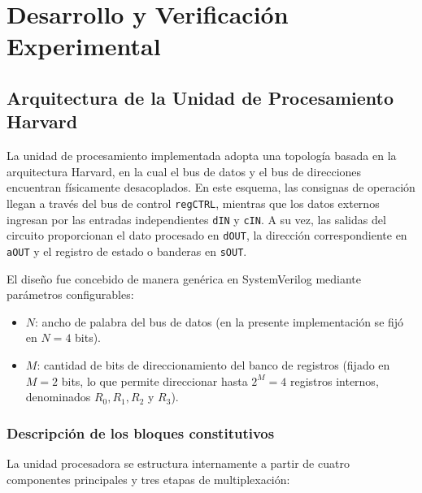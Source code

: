 \chapter{Desarrollo y Verificación Experimental}\label{sec.ej1:desarrollo}

\section{Arquitectura de la Unidad de Procesamiento Harvard}

La unidad de procesamiento implementada adopta una topología basada en la arquitectura Harvard,
en la cual el bus de datos y el bus de direcciones encuentran físicamente desacoplados. En este esquema,
las consignas de operación llegan a través del bus de control \texttt{regCTRL}, mientras que los
datos externos ingresan por las entradas independientes \texttt{dIN} y \texttt{cIN}. A su
vez, las salidas del circuito proporcionan el dato procesado en \texttt{dOUT}, la dirección correspondiente en
\texttt{aOUT} y el registro de estado o banderas en \texttt{sOUT}.

El diseño fue concebido de manera genérica en SystemVerilog mediante parámetros configurables:
\begin{itemize}
  \item $N$: ancho de palabra del bus de datos (en la presente implementación se fijó en $N = 4$ bits).
  \item $M$: cantidad de bits de direccionamiento del banco de registros (fijado en $M = 2$ bits, lo que permite
        direccionar hasta $2^M = 4$ registros internos, denominados $R_0, R_1, R_2$ y $R_3$).
\end{itemize}

\subsection{Descripción de los bloques constitutivos}

La unidad procesadora se estructura internamente a partir de cuatro componentes principales y tres etapas de
multiplexación:

